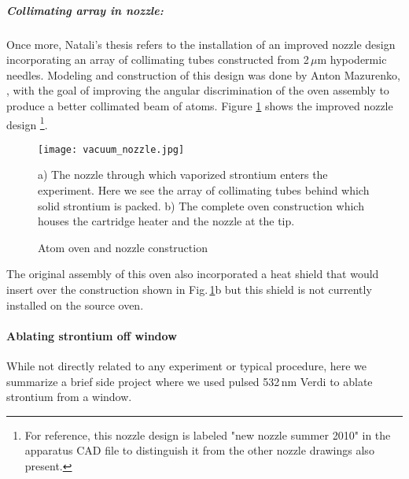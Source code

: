 \subparagraph{Collimating array in nozzle:}
Once more, Natali's thesis refers to the installation of an improved nozzle design incorporating an array of collimating tubes constructed from 2\,$\mu$m hypodermic needles. 
Modeling and construction of this design was done by Anton Mazurenko, \cite{Mazurenko2010}, with the goal of improving the angular discrimination of the oven assembly to produce a better collimated beam of atoms.
Figure \ref{fig:2010_nozzle} shows the improved nozzle design \footnote{For reference, this nozzle design is labeled "new nozzle summer 2010" in the apparatus CAD file to distinguish it from the other nozzle drawings also present.}.
	\begin{figure}
		\centerline{
		\texttt{[image: vacuum\_nozzle.jpg]}}
		\caption{Atom oven and nozzle construction}{a) The nozzle through which vaporized strontium enters the experiment. Here we see the array of collimating tubes behind which solid strontium is packed. b) The complete oven construction which houses the cartridge heater and the nozzle at the tip.}
		\label{fig:2010_nozzle}
	\end{figure}
The original assembly of this oven also incorporated a heat shield that would insert over the construction shown in Fig.\,\ref{fig:2010_nozzle}b but this shield is not currently installed on the source oven.
 
\paragraph{Ablating strontium off window} \label{p:ablatingSr}
While not directly related to any experiment or typical procedure, here we summarize a brief side project where we used pulsed 532\,nm Verdi to ablate strontium from a window.

